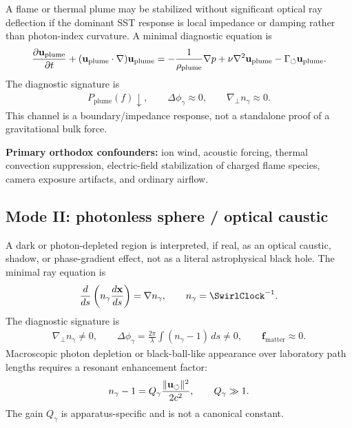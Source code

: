 A flame or thermal plume may be stabilized without significant optical ray
deflection if the dominant SST response is local impedance or damping rather
than photon-index curvature. A minimal diagnostic equation is
\begin{align}
    \frac{\partial\mathbf{u}_{\mathrm{plume}}}{\partial t}
    +
    (\mathbf{u}_{\mathrm{plume}}\cdot\nabla)\mathbf{u}_{\mathrm{plume}}
    =
    -\frac{1}{\rho_{\mathrm{plume}}}\nabla p
    +
    \nu\nabla^2\mathbf{u}_{\mathrm{plume}}
    -
    \Gamma_{\boldsymbol{\circlearrowleft}}\mathbf{u}_{\mathrm{plume}}.
    \label{eq:rt_flame_lock_plume_equation}
\end{align}
The diagnostic signature is
\begin{align}
    P_{\mathrm{plume}}(f)\downarrow,
    \qquad
    \Delta\phi_\gamma\approx0,
    \qquad
    \nabla_\perp n_\gamma\approx0.
    \label{eq:rt_flame_lock_signature}
\end{align}
This channel is a boundary/impedance response, not a standalone proof of a
gravitational bulk force.

\textbf{Primary orthodox confounders:}
ion wind, acoustic forcing, thermal convection suppression, electric-field
stabilization of charged flame species, camera exposure artifacts, and ordinary
airflow.

\subsection{Mode II: photonless sphere / optical caustic}

A dark or photon-depleted region is interpreted, if real, as an optical caustic,
shadow, or phase-gradient effect, not as a literal astrophysical black hole. The
minimal ray equation is
\begin{align}
    \frac{d}{ds}
    \left(
    n_\gamma\frac{d\mathbf{x}}{ds}
    \right)
    =
    \nabla n_\gamma,
    \qquad
    n_\gamma=\SwirlClock^{-1}.
    \label{eq:rt_photonless_caustic_ray}
\end{align}
The diagnostic signature is
\begin{align}
    \nabla_\perp n_\gamma\neq0,
    \qquad
    \Delta\phi_\gamma
    =
    \frac{2\pi}{\lambda}
    \int(n_\gamma-1)\,ds
    \neq0,
    \qquad
    \mathbf{f}_{\mathrm{matter}}\approx0.
    \label{eq:rt_photonless_caustic_signature}
\end{align}
Macroscopic photon depletion or black-ball-like appearance over laboratory path
lengths requires a resonant enhancement factor:
\begin{align}
    n_\gamma-1
    =
    Q_\gamma
    \frac{\lVert\mathbf{u}_{\boldsymbol{\circlearrowleft}}\rVert^2}{2c^2},
    \qquad
    Q_\gamma\gg1.
    \label{eq:rt_optical_gain_factor}
\end{align}
The gain \(Q_\gamma\) is apparatus-specific and is not a canonical constant.

